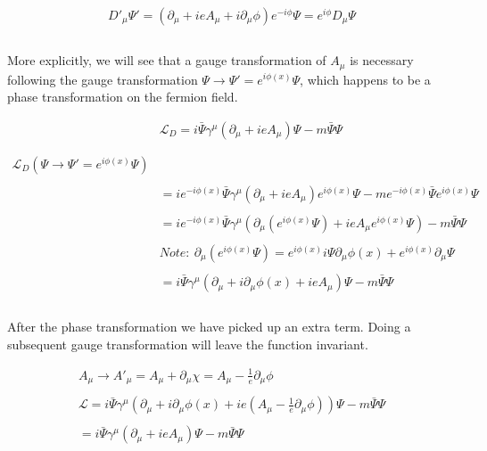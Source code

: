 \documentclass[aps,secnumarabic,nobalancelastpage,amsmath,amssymb,
nofootinbib]{revtex4}
\newcommand{\Lagr}{\mathcal{L}}
\begin{document}
\begin{equation}
\begin{split}
D'_\mu \Psi' = (\partial_\mu + i e A_\mu + i \partial_\mu \phi) e^{-i \phi} \Psi= e^{i \phi} D_\mu \Psi \\\\
\end{split}
\end{equation}

More explicitly, we will see that a gauge transformation of $A_\mu$ is necessary following the gauge transformation $\Psi \rightarrow \Psi'=e^{i \phi(x)}\Psi$, which happens to be a phase transformation on the fermion field.

\begin{equation}
\begin{aligned}
&\Lagr_D= i \bar{\Psi} \gamma^{\mu} (\partial_\mu + i e A_\mu) \Psi - m \bar{\Psi} \Psi 
\\\\\\
\Lagr_D(\Psi \rightarrow \Psi'=e^{i \phi(x)}\Psi) &
\\\\
 &= i e^{-i \phi(x)}\bar{\Psi} \gamma^{\mu} (\partial_\mu + i e A_\mu) e^{i \phi(x)}\Psi - m e^{-i \phi(x)}\bar{\Psi} e^{i \phi(x)}\Psi\\ \\
&=i e^{-i \phi(x)}\bar{\Psi} \gamma^{\mu} (\partial_\mu (e^{i \phi(x)}\Psi) + i e A_\mu e^{i \phi(x)}\Psi )- m \bar{\Psi} \Psi
\\\\
&Note: \ \partial_\mu (e^{i \phi(x)} \Psi) = e^{i \phi(x)} i \Psi \partial_{\mu} \phi(x) + e^{i \phi(x)} \partial_{\mu} \Psi\\\\
 &= i \bar{\Psi} \gamma^{\mu} (\partial_\mu + i \partial_
 \mu \phi(x)+i e A_\mu) \Psi - m \bar{\Psi}\Psi\\\\
\end{aligned}
\end{equation}

After the phase transformation we have picked up an extra term. Doing a subsequent gauge transformation will leave the function invariant.

\begin{equation}
\begin{split}
A_\mu \rightarrow A'_\mu = A_\mu + \partial_\mu \chi = A_\mu - \frac{1}{e} \partial_\mu \phi\\
\\
\Lagr= i \bar{\Psi} \gamma^{\mu} (\partial_\mu + i \partial_
 \mu \phi(x)+i e (A_\mu - \frac{1}{e} \partial_\mu \phi)) \Psi - m \bar{\Psi}\Psi\\
 \\
 = i \bar{\Psi} \gamma^{\mu} (\partial_\mu + i e A_\mu) \Psi - m \bar{\Psi} \Psi \\\\
 \end{split}
\end{equation}
\end{document}
